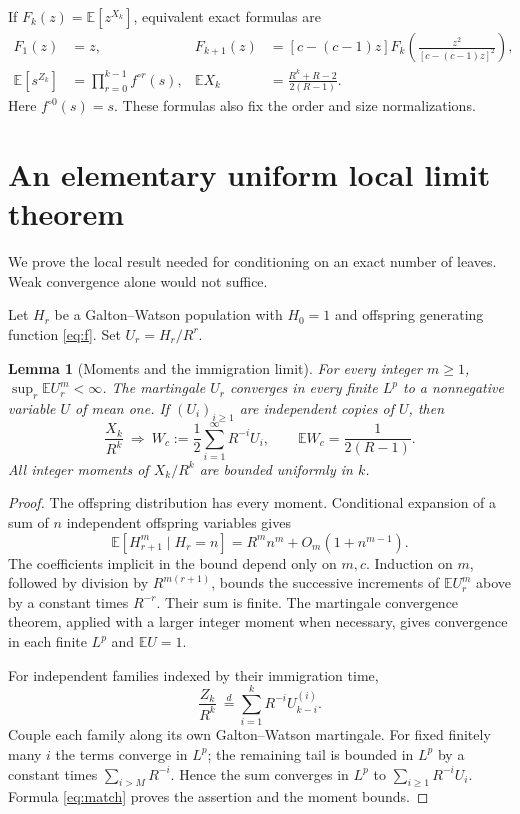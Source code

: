 \documentclass[11pt,a4paper]{article}
\newtheorem{lemma}[theorem]{Lemma}
\theoremstyle{remark}\newtheorem{remark}[theorem]{Remark}
\newcommand{\E}{\mathbb E}\newcommand{\Pp}{\mathbb P}
\begin{document}
If $F_k(z)=\E[z^{X_k}]$, equivalent exact formulas are
\begin{align}
F_1(z)&=z,&F_{k+1}(z)&=[c-(c-1)z]
 F_k\!\left(\frac{z^2}{[c-(c-1)z]^2}\right),\label{eq:leafpgf}\\
\E[s^{Z_k}]&=\prod_{r=0}^{k-1}f^{\circ r}(s),&
\E X_k&=\frac{R^k+R-2}{2(R-1)}.\label{eq:mean}
\end{align}
Here $f^{\circ0}(s)=s$. These formulas also fix the order and size normalizations.

\section{An elementary uniform local limit theorem}
We prove the local result needed for conditioning on an exact number of leaves. Weak convergence alone would not suffice.

Let $H_r$ be a Galton--Watson population with $H_0=1$ and offspring generating function \eqref{eq:f}. Set $U_r=H_r/R^r$.

\begin{lemma}[Moments and the immigration limit]\label{lem:moments}
For every integer $m\ge1$, $\sup_r\E U_r^m<\infty$. The martingale $U_r$ converges in every finite $L^p$ to a nonnegative variable $U$ of mean one. If $(U_i)_{i\ge1}$ are independent copies of $U$, then
\begin{equation}\label{eq:W}
\frac{X_k}{R^k}\ \Longrightarrow\ W_c
 :=\frac12\sum_{i=1}^{\infty}R^{-i}U_i,
\qquad \E W_c=\frac1{2(R-1)}.
\end{equation}
All integer moments of $X_k/R^k$ are bounded uniformly in $k$.
\end{lemma}
\begin{proof}
The offspring distribution has every moment. Conditional expansion of a sum of $n$ independent offspring variables gives
\[
\E[H_{r+1}^m\mid H_r=n]
 =R^m n^m+O_m(1+n^{m-1}).
\]
The coefficients implicit in the bound depend only on $m,c$. Induction on $m$, followed by division by $R^{m(r+1)}$, bounds the successive increments of $\E U_r^m$ above by a constant times $R^{-r}$. Their sum is finite. The martingale convergence theorem, applied with a larger integer moment when necessary, gives convergence in each finite $L^p$ and $\E U=1$.

For independent families indexed by their immigration time,
\[
\frac{Z_k}{R^k}\ \stackrel d=\sum_{i=1}^k R^{-i}U_{k-i}^{(i)}.
\]
Couple each family along its own Galton--Watson martingale. For fixed finitely many $i$ the terms converge in $L^p$; the remaining tail is bounded in $L^p$ by a constant times $\sum_{i>M}R^{-i}$. Hence the sum converges in $L^p$ to $\sum_{i\ge1}R^{-i}U_i$. Formula \eqref{eq:match} proves the assertion and the moment bounds.
\end{proof}
\end{document}
